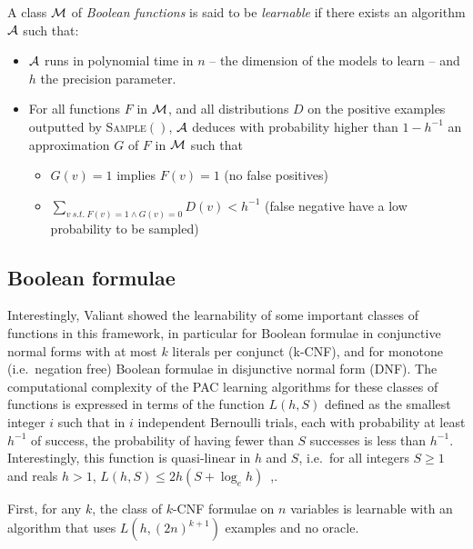 \documentclass{llncs}
\begin{document}
\begin{definition}
	\label{def:learnclass}
   A class $\cal M$ of \emph{Boolean functions} is said to be \emph{learnable}
   if there exists an algorithm $\cal A$ such that:
   \begin{itemize}
      \item $\cal A$ runs in polynomial time in $n$ -- the dimension of the models to learn -- and $h$ the precision parameter.
      \item
         For all functions $F$ in $\cal M$, and all distributions $D$ on the positive examples outputted by \textsc{Sample}$()$,
         $\cal A$ deduces with probability higher than $1-h^{-1}$ an approximation $G$ of $F$ in $\cal M$ such that
         \begin{itemize}
            \item $G(v)=1$ implies $F(v)=1$ (no false positives)
            \item
               $\sum_{v\ s.t.\ F(v)=1\wedge G(v)=0} D(v) < h^{-1}$ (false negative have a low probability to be sampled)
         \end{itemize}
   \end{itemize}
\end{definition}


\subsection{Boolean formulae}

Interestingly, Valiant showed the learnability of some important classes of functions in this framework,
in particular for Boolean formulae in conjunctive normal forms with at most $k$ literals per conjunct (k-CNF),
and for monotone (i.e.~negation free) Boolean formulae in disjunctive normal form (DNF).
The computational complexity of the PAC learning algorithms for these classes of functions is expressed in terms of the function
$L(h,S)$ defined as the smallest integer $i$ such that
in $i$ independent Bernoulli trials, each with probability at least $h^{-1}$ of success, the probability of having fewer than $S$ successes is less than $h^{-1}$.
Interestingly, this function is quasi-linear in $h$ and $S$, i.e.~for all
integers $S\ge 1$ and reals $h>1$, $L(h,S) \le 2h(S+\log_e h)$~\cite{Valiant84cacm},.

\begin{theorem}\label{thm:kcnf}
First, for any $k$, the class of $k$-CNF formulae on $n$ variables is learnable with an
algorithm that uses $L(h,{(2 n)}^{k+1})$ examples and no oracle.
\end{theorem}
\end{document}
